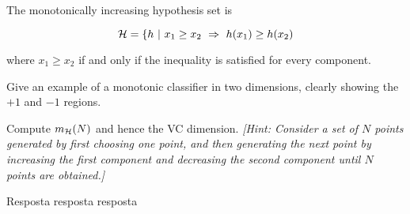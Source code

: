 \begin{enunciado}{15}
    The monotonically increasing hypothesis set is
    
    $$ \mathcal{H} = \{ h~|~ x_1 \ge x_2 ~ \Rightarrow ~ h(x_1) \ge h(x_2) $$
    
    where $x_1 \ge x_2$ if and only if the inequality is satisfied for every component.
    
     Give an example of a monotonic classifier in two dimensions, clearly showing the $+1$ and $-1$ regions.
    
     Compute $m_{\mathcal{H}}(N)$ and hence the VC dimension. \textit{[Hint: Consider a set of $N$ points generated by first choosing one point, and then generating the next point by increasing the first component and decreasing the second component until $N$ points are obtained.]}
\end{enunciado}

Resposta resposta resposta